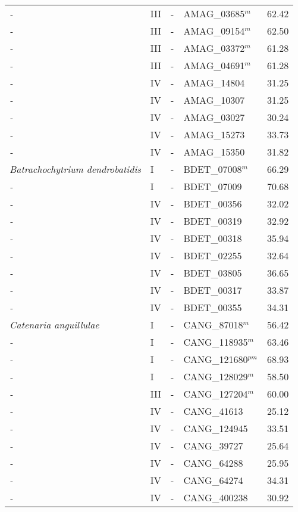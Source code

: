 {{\begin{longtable}{llllr}
  \emph{-} & III & - & AMAG\_03685$^{m}$ & 62.42 \\ 
  \emph{-} & III & - & AMAG\_09154$^{m}$ & 62.50 \\ 
  \emph{-} & III & - & AMAG\_03372$^{m}$ & 61.28 \\ 
  \emph{-} & III & - & AMAG\_04691$^{m}$ & 61.28 \\ 
  \emph{-} & IV & - & AMAG\_14804 & 31.25 \\ 
  \emph{-} & IV & - & AMAG\_10307 & 31.25 \\ 
  \emph{-} & IV & - & AMAG\_03027 & 30.24 \\ 
  \emph{-} & IV & - & AMAG\_15273 & 33.73 \\ 
  \emph{-} & IV & - & AMAG\_15350 & 31.82 \\ 
  \emph{Batrachochytrium dendrobatidis } & I & - & BDET\_07008$^{m}$ & 66.29 \\ 
  \emph{-} & I & - & BDET\_07009 & 70.68 \\ 
  \emph{-} & IV & - & BDET\_00356 & 32.02 \\ 
  \emph{-} & IV & - & BDET\_00319 & 32.92 \\ 
  \emph{-} & IV & - & BDET\_00318 & 35.94 \\ 
  \emph{-} & IV & - & BDET\_02255 & 32.64 \\ 
  \emph{-} & IV & - & BDET\_03805 & 36.65 \\ 
  \emph{-} & IV & - & BDET\_00317 & 33.87 \\ 
  \emph{-} & IV & - & BDET\_00355 & 34.31 \\ 
  \emph{Catenaria anguillulae} & I & - & CANG\_87018$^{m}$ & 56.42 \\ 
  \emph{-} & I & - & CANG\_118935$^{m}$ & 63.46 \\ 
  \emph{-} & I & - & CANG\_121680$^{pm}$ & 68.93 \\ 
  \emph{-} & I & - & CANG\_128029$^{m}$ & 58.50 \\ 
  \emph{-} & III & - & CANG\_127204$^{m}$ & 60.00 \\ 
  \emph{-} & IV & - & CANG\_41613 & 25.12 \\ 
  \emph{-} & IV & - & CANG\_124945 & 33.51 \\ 
  \emph{-} & IV & - & CANG\_39727 & 25.64 \\ 
  \emph{-} & IV & - & CANG\_64288 & 25.95 \\ 
  \emph{-} & IV & - & CANG\_64274 & 34.31 \\ 
  \emph{-} & IV & - & CANG\_400238 & 30.92 \\ 

\end{longtable}}}
